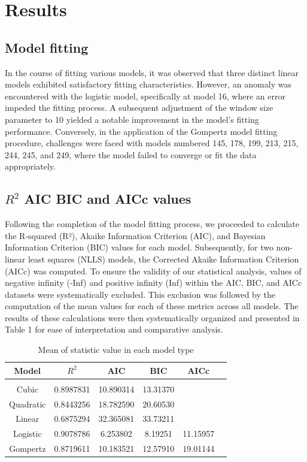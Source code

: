 \documentclass[11pt]{article}
\begin{document}
\section{Results}
\subsection{Model fitting}

In the course of fitting various models, it was observed that three distinct linear models exhibited satisfactory fitting characteristics. However, an anomaly was encountered with the logistic model, specifically at model 16, where an error impeded the fitting process. A subsequent adjustment of the window size parameter to 10 yielded a notable improvement in the model's fitting performance. Conversely, in the application of the Gompertz model fitting procedure, challenges were faced with models numbered 145, 178, 199, 213, 215, 244, 245, and 249, where the model failed to converge or fit the data appropriately. 

\subsection{$R^2$ AIC BIC and AICc values}
Following the completion of the model fitting process, we proceeded to calculate the R-squared (R²), Akaike Information Criterion (AIC), and Bayesian Information Criterion (BIC) values for each model. Subsequently, for two non-linear least squares (NLLS) models, the Corrected Akaike Information Criterion (AICc) was computed. To ensure the validity of our statistical analysis, values of negative infinity (-Inf) and positive infinity (Inf) within the AIC, BIC, and AICc datasets were systematically excluded. This exclusion was followed by the computation of the mean values for each of these metrics across all models. The results of these calculations were then systematically organized and presented in Table 1 for ease of interpretation and comparative analysis.
\hfill\break

 
 \begin{table}[ht]
     \centering
     \begin{tabular}{cccccc}
         Model & $R^2$ & AIC & BIC & AICc\\
         \hline
         & & & & \\
          Cubic & 0.8987831 & 10.890314 & 13.31370 &   \\
          Quadratic & 0.8443256 & 18.782590 & 20.60530 &   \\
          Linear & 0.6875294 & 32.365081 & 33.73211 &   \\
          Logistic & 0.9078786 & 6.253802 & 8.19251 & 11.15957 \\
          Gompertz & 0.8719611 & 10.183521 & 12.57910 & 19.01144 \\
          \hline
     \end{tabular}
     \caption{Mean of statistic value in each model type}
     \label{tab:my_label}
 \end{table}
\end{document}
